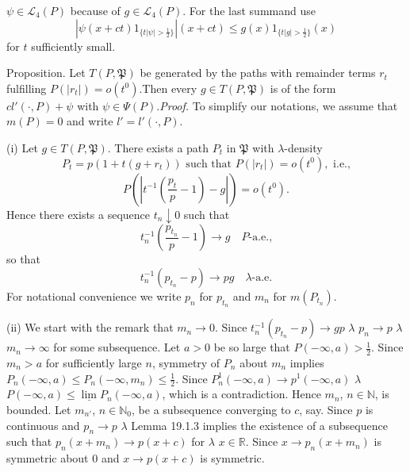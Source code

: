\documentclass[12pt,reqno]{amsart} %
\begin{document}
$\psi \in \mathcal{L}_4(P)$ because of $g \in \mathcal{L}_4(P)$. For
the last summand use\[|\psi(x+ct)1_{\{t|\psi| >
\frac{1}{2}\}}|(x+ct) \leq g(x)1_{\{t|g| > \frac{1}{2}\}}(x)\]for
$t$ sufficiently small.

Proposition. Let $T(P,\mathfrak{P})$ be generated by the paths with
remainder terms $r_t$ fulfilling $P(|r_t|) = o(t^0)$.Then every $g \in
T(P,\mathfrak{P})$ is of the form $cl'(\cdot, P) + \psi$ with $\psi
\in \Psi(P)$.{\it Proof.} To simplify our notations, we
assume that $m(P) = 0$ and write $l'=l'(\cdot,P)$.

(i)
Let $g \in T(P,\mathfrak{P})$. There exists a path $P_t$ in
$\mathfrak{P}$ with $\lambda$-density\[P_t = p(1 + t(g+r_t))
\text{ such that } P(|r_t|) = o(t^0), \text{ i.e.,}\]\[P(|t^{-1}
(\frac{p_t}{p} - 1) - g|) = o(t^0).\]Hence there exists a sequence
$t_n \downarrow 0$ such that\[t_n^{-1} (\frac{p_{t_n}}{p} - 1)
\rightarrow g \quad P\text{-a.e.,}\]so
that\begin{equation*}t_n^{-1} (p_{t_n} - p) \rightarrow pg \quad
\lambda \text{-a.e.}\end{equation*}For notational convenience we
write $p_n$ for $p_{t_n}$ and $m_n$ for
$m(P_{t_n})$.

(ii) We start with the remark that $m_n
\rightarrow 0$. Since $t_n^{-1} (p_{t_n} - p) \rightarrow gp$
$\lambda$ $p_n \rightarrow p$
$\lambda$ $m_n \rightarrow \infty$ for
some subsequence. Let $a > 0$ be so large that $P(-\infty, a) >
\frac{1}{2}$. Since $m_n > a$ for sufficiently large $n$, symmetry of
$P_n$ about $m_n$ implies $P_n(-\infty, a) \leq P_n(-\infty, m_n) \leq
\frac{1}{2}$. Since $P_n^1(-\infty, a) \rightarrow p^1 (-\infty, a)$
$\lambda$ $P(-\infty, a) \leq
\underline{\lim} P_n(-\infty, a)$, which is a contradiction. Hence
$m_n$, $n \in \mathbb{N}$, is bounded. Let $m_{n'}$, $n \in
\mathbb{N}_0$, be a subsequence converging to $c$, say. Since $p$ is
continuous and $p_n \rightarrow p$ $\lambda$  Lemma 19.1.3
implies the existence of a subsequence such that $p_n(x+m_n)
\rightarrow p(x+c)$ for $\lambda$ $x \in \mathbb{R}$.
Since $x \rightarrow p_n(x+m_n)$ is symmetric about $0$ and $x
\rightarrow p(x+c)$ is symmetric.

\pagebreak
\end{document}
